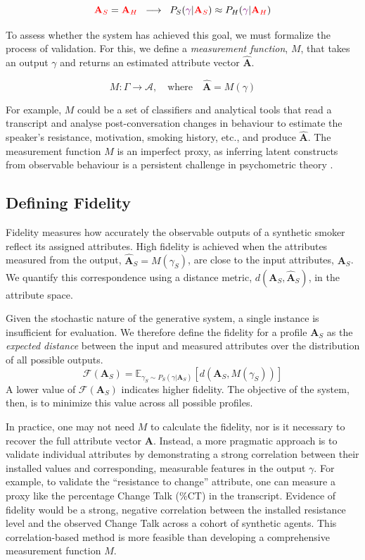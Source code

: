 \[ \textcolor{red}{\textbf{A}_S} = \textcolor{red}{\textbf{A}_H} \; \; \longrightarrow \;  \; P_S(\textcolor{violet}{\gamma} | \textcolor{red}{\textbf{A}_S}) \approx P_H(\textcolor{violet}{\gamma} | \textcolor{red}{\textbf{A}_H}) \]

To assess whether the system has achieved this goal, we must formalize the process of
validation. For this, we define a \emph{measurement function}, $M$, that takes an
output $\gamma$ and returns an estimated attribute vector $\hat{\textbf{A}}$.

\[M: \Gamma \rightarrow \mathcal{A}, \quad \text{where} \quad \hat{\textbf{A}} = M(\gamma)\]

For example, $M$ could be a set of classifiers and analytical tools that read a
transcript and analyse post-conversation changes in behaviour to estimate the speaker's
resistance, motivation, smoking history, etc., and produce $\hat{\textbf{A}}$. The
measurement function $M$ is an imperfect proxy, as inferring latent constructs from
observable behaviour is a persistent challenge in psychometric theory
\cite{loevinger1957objective, borsboom2004concept}.

\subsection{Defining Fidelity}
Fidelity measures how accurately the observable outputs of a synthetic smoker reflect
its assigned attributes. High fidelity is achieved when the attributes measured from
the output, $\hat{\textbf{A}}_S = M(\gamma_S)$, are close to the input attributes,
$\textbf{A}_S$. We quantify this correspondence using a distance metric,
$d(\textbf{A}_S, \hat{\textbf{A}}_S)$, in the attribute space.

Given the stochastic nature of the generative system, a single instance is insufficient
for evaluation. We therefore define the fidelity for a profile $\textbf{A}_S$ as the
\emph{expected distance} between the input and measured attributes over the
distribution of all possible outputs.
\[\mathcal{F}(\textbf{A}_S) = \mathbb{E}_{\gamma_S \sim P_S(\gamma | \textbf{A}_S)}[d(\textbf{A}_S, M(\gamma_S))]\]
A lower value of $\mathcal{F}(\textbf{A}_S)$ indicates higher fidelity. The objective
of the system, then, is to minimize this value across all possible profiles.

In practice, one may not need $M$ to calculate the fidelity, nor is it necessary to
recover the full attribute vector $\textbf{A}$. Instead, a more pragmatic approach is
to validate individual attributes by demonstrating a strong correlation between their
installed values and corresponding, measurable features in the output $\gamma$. For
example, to validate the ``resistance to change'' attribute, one can measure a proxy
like the percentage Change Talk (\%CT) in the transcript. Evidence of fidelity would be
a strong, negative correlation between the installed resistance level and the observed
Change Talk across a cohort of synthetic agents. This correlation-based method is more
feasible than developing a comprehensive measurement function $M$.

